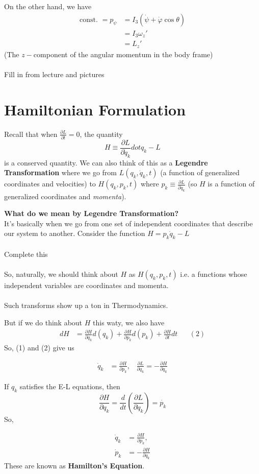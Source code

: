 \documentclass[11pt]{article}
\begin{document}
On the other hand, we have 
\begin{align*}
  \text{const. } = p_{\psi} &= I_3 \left( \dot{\psi} + \dot{\varphi} \cos\theta \right) \\
  &= I_3 \omega_{z}' \\
  &= L_z' 
\end{align*}
(The $z-$component of the angular momentum in the body frame)
\\
\\
Fill in from lecture and pictures

\vskip 1cm
\section{Hamiltonian Formulation}
Recall that when $\frac{\partial L}{\partial t} = 0$, the quantity 
\[ H \equiv \frac{\partial L}{\partial \dot{q}_k} dot{q}_k - L \] is a conserved quantity. We can also think of this as a \textbf{Legendre Transformation} where we go from $L(q_{k}, \dot{q}_{k}, t)$ (a function of generalized coordinates and velocities) to $H(q_{k}, p_{k}, t)$ where $p_{k} \equiv \frac{\partial L}{\partial \dot{q}_k}$ (so $H$ is a function of generalized coordinates and \textit{momenta}).

\begin{redbox}
  \textbf{What do we mean by Legendre Transformation?}
  \\
  It's basically when we go from one set of independent coordinates that describe our system to another. Consider the function $H = p_{k} \dot{q}_k - L$ 
  \\
  \\
  Complete this 
  \\
  \\
  So, naturally, we should think about $H$ as $H(q_k, p_k, t)$ i.e. a functions whose independent variables are coordinates and momenta.
  \\
  \\
  Such transforms show up a ton in Thermodynamics.
\end{redbox}

But if we do think about $H$ this waty, we also have
\begin{align*}
  dH &= \frac{\partial H}{\partial q_k} d(q_k) + \frac{\partial H}{\partial p_k} d(p_k) + \frac{\partial H}{\partial t} dt \;\;\;\;\;\;(2)
\end{align*}
So, (1) and (2) give us 

\begin{align*}
  \dot{q}_{k} &= \frac{\partial H}{\partial p_k},\;\;\; \frac{\partial L}{\partial q_{k}} = - \frac{\partial H}{\partial q_k}
\end{align*}

If $q_k$ satisfies the E-L equations, then 
\[ \frac{\partial H}{\partial q_{k}} = \frac{d}{dt} \left( \frac{\partial L}{\partial \dot{q}_k} \right) = \dot{p_k} \]
So, 
\begin{bluebox}
  \begin{align*}
    \dot{q}_k &= \frac{\partial H}{\partial p_{k}},\\
    \dot{p}_k &= - \frac{\partial H}{\partial q_{k}}
  \end{align*}
  These are known as \textbf{Hamilton's Equation}.
\end{bluebox}
\end{document}

